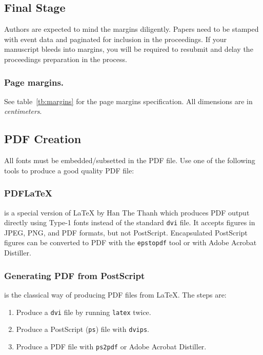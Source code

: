 \documentclass{ifacconf}
\begin{document}
\subsection{Final Stage}

Authors are expected to mind the margins diligently.  Papers need to
be stamped with event data and paginated for inclusion in the
proceedings. If your manuscript bleeds into margins, you will be
required to resubmit and delay the proceedings preparation in the
process.

\subsubsection{Page margins.} See table~\ref{tb:margins} for the
page margins specification. All dimensions are in \emph{centimeters}.


\subsection{PDF Creation}

All fonts must be embedded/subsetted in the PDF file. Use one of the
following tools to produce a good quality PDF file:

\subsubsection{PDFLaTeX} is a special version of LaTeX by Han The
Thanh which produces PDF output directly using Type-1 fonts instead of
the standard \texttt{dvi} file. It accepts figures in JPEG, PNG, and PDF
formats, but not PostScript. Encapsulated PostScript figures can be
converted to PDF with the \texttt{epstopdf} tool or with Adobe Acrobat
Distiller.

\subsubsection{Generating PDF from PostScript} is the classical way of
producing PDF files from LaTeX. The steps are:

\begin{enumerate}
  \item Produce a \texttt{dvi} file by running \texttt{latex} twice.
  \item Produce a PostScript (\texttt{ps}) file with \texttt{dvips}.
  \item Produce a PDF file with \texttt{ps2pdf} or Adobe Acrobat
  Distiller.
\end{enumerate}
\end{document}
